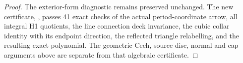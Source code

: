 \begin{proof}
The exterior-form diagnostic remains preserved unchanged.
The new certificate, ,
passes 41 exact checks of the actual
period-coordinate arrow, all integral H1 quotients, the line
connection deck invariance, the cubic collar identity with its
endpoint direction, the reflected triangle relabelling, and the
resulting exact polynomial. The geometric Cech, source-disc,
normal and cap arguments above are separate from that algebraic
certificate.
\end{proof}
